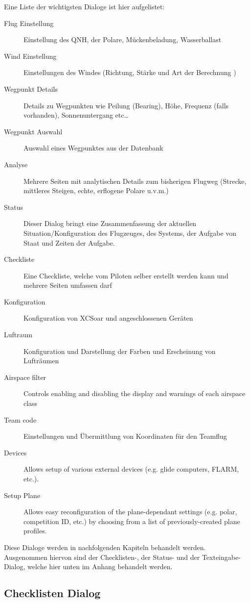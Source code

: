 Eine Liste der wichtigsten Dialoge ist hier aufgelistet:
\begin{description}
\item[Flug Einstellung] Einstellung des QNH, der Polare, Mückenbeladung, Wasserballast
\item[Wind Einstellung] Einstellungen des Windes (Richtung, Stärke und Art der Berechnung )
\item[Wegpunkt Details] Details zu Wegpunkten wie Peilung (Bearing), Höhe, Frequenz (falls vorhanden), Sonnenuntergang  etc\dots
\item[Wegpunkt Auswahl] Auswahl eines Wegpunktes aus der Datenbank
\item[Analyse] Mehrere Seiten mit analytischen Details zum bisherigen Flugweg (Strecke, mittleres Steigen, echte, erflogene Polare u.v.m.)
\item[Status] Dieser Dialog bringt eine Zusammenfassung der aktuellen Situation/Konfiguration  des Flugzeuges, des Systems, der Aufgabe von Staat und Zeiten der Aufgabe.
\item[Checkliste] Eine Checkliste, welche vom Piloten selber erstellt werden kann und mehrere Seiten umfassen darf
\item[Konfiguration] Konfiguration von  \textsf{XCSoar} und angeschlossenen Geräten
\item[Luftraum] Konfiguration und Darstellung der Farben und Erscheinung von Lufträumen
\item[Airspace filter] Controls enabling and disabling the display and warnings
of each airspace class
\item[Team code] Einstellungen und Übermittlung von Koordinaten für den Teamflug
\item[Devices] Allows setup of various external devices (e.g. glide computers, FLARM, etc.).
\item[Setup Plane] Allows easy reconfiguration of the plane-dependant settings (e.g. polar, competition ID, etc.) by choosing from a list of previously-created plane profiles.
\end{description}

Diese Dialoge werden in nachfolgenden Kapiteln behandelt werden. Ausgenommen hiervon sind der Checklisten-, der Status-  und der Texteingabe-Dialog, welche hier unten im Anhang behandelt werden.

\subsection*{Checklisten Dialog}

